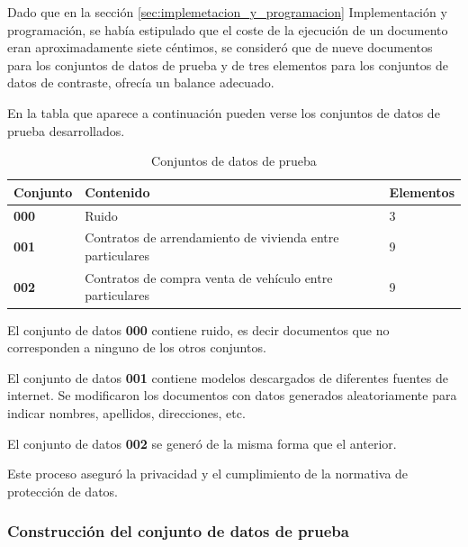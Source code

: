 Dado que en la sección \ref{sec:implemetacion_y_programacion} Implementación y programación, se había estipulado
que el coste de la ejecución de un documento eran aproximadamente siete céntimos, se consideró que de nueve documentos
para los conjuntos de datos de prueba y de tres elementos para los conjuntos de datos de contraste, ofrecía un
balance adecuado.

En la tabla que aparece a continuación pueden verse los conjuntos de datos de prueba desarrollados.

\begin{table}[h]
    \renewcommand{\arraystretch}{1.5}
    \setlength{\tabcolsep}{10pt}
    \centering
    \begin{tabular}{>{\bfseries}p{} p{} p{}}
        \toprule
        \textbf{Conjunto} & \textbf{Contenido}                                        & \textbf{Elementos} \\
        \midrule
        \textbf{000}      & Ruido                                                     & 3                  \\
        \textbf{001}      & Contratos de arrendamiento de vivienda entre particulares & 9                  \\
        \textbf{002}      & Contratos de compra venta de vehículo entre particulares  & 9                  \\
        \bottomrule
    \end{tabular}
    \caption{Conjuntos de datos de prueba}
    \label{tab:data_sets}
\end{table}

El conjunto de datos \textbf{000} contiene ruido, es decir documentos que no corresponden a ninguno de los
otros conjuntos.

El conjunto de datos \textbf{001} contiene modelos descargados de diferentes fuentes de internet.
Se modificaron los documentos con datos generados aleatoriamente para indicar nombres, apellidos, direcciones, etc.

El conjunto de datos \textbf{002} se generó de la misma forma que el anterior.

Este proceso aseguró la privacidad y el cumplimiento de la normativa de protección de datos.



\subsubsection*{Construcción del conjunto de datos de prueba}


